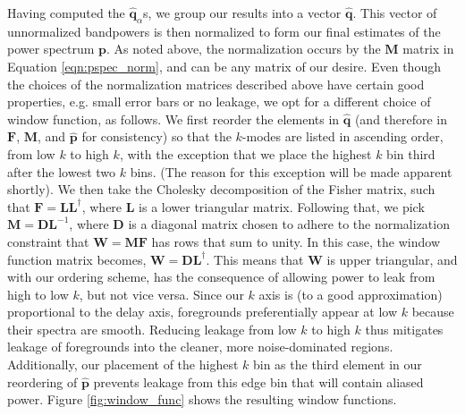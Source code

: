 \documentclass[twocolumn,numberedappendix]{emulateapj} \shorttitle{New Limits on the 21 cm Power Spectrum at $z=8.4$}
\newcommand{\qhat}{\hat{\mathbf{q}}}
\begin{document}
Having computed the $\qhat_{\alpha}$s, we group our results into a vector $\mathbf{\hat{q}}$.
This vector of unnormalized bandpowers is then normalized to form our final estimates of the
power spectrum $\mathbf{p}$. As noted above, the
normalization occurs by the $\mathbf{M}$ matrix in Equation
\eqref{eqn:pspec_norm}, and can be any matrix of our desire. 
Even though the choices of the normalization matrices described above have certain
good properties, e.g. small error bars or no leakage, we opt for a different
choice of window function, as follows. We first reorder the elements in $\mathbf{\hat{q}}$ (and
therefore in $\mathbf{F}$, $\mathbf{M}$, and $\mathbf{\hat{p}}$ for consistency) so that
the $k$-modes are listed in ascending order, from low $k$ to high $k$, with the exception that we place the highest $k$ bin third after the lowest two $k$ bins. (The reason for this exception will be made apparent shortly). We then take the Cholesky decomposition of
the Fisher matrix, such that $\mathbf{F}=\mathbf{L}\mathbf{L}^{\dagger}$, where
$\mathbf{L}$ is a lower triangular matrix. Following that, we pick ${\mathbf{M}} = \mathbf{D} \mathbf{L}^{-1}$, where $\mathbf{D}$ is a diagonal matrix chosen to adhere to the normalization constraint
that $\mathbf{W} = \mathbf{M} \mathbf{F}$ has rows that sum to unity. In this case, the window function matrix becomes,
$\mathbf{W}=\mathbf{D} \mathbf{L}^{\dagger}$. This means that $\mathbf{W}$ is upper triangular,
and with our ordering scheme, has the consequence of allowing power to leak from high to low $k$,
but not vice versa. Since our $k$ axis is (to a good approximation) proportional to the delay axis, foregrounds preferentially appear at low $k$ because their spectra are smooth. Reducing leakage
from low $k$ to high $k$ thus mitigates leakage
of foregrounds into the cleaner, more noise-dominated regions. Additionally, our placement of the highest $k$ bin as the third element in our reordering of 
$\mathbf{\hat{p}}$ prevents leakage from this edge bin that will contain aliased power. Figure
\ref{fig:window_func} shows the resulting window functions. 
\end{document}
